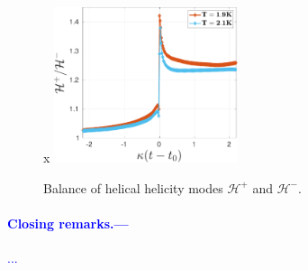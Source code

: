 \documentclass[%
 reprint,
 amsmath,amssymb,
 aps,
 prl,
]{revtex4-2}
\def\blue#1{\textcolor{blue}{#1}}
\begin{document}
\begin{figure}x
    \centering
    \includegraphics*[width=0.48\textwidth]{hel-decomp.pdf}
    \caption{Balance of helical helicity modes $\mathcal{H}^+$ and $\mathcal{H}^-$. }
    \label{fig:helicity-modes}
\end{figure}
\blue{
\paragraph*{Closing remarks.---}...
}

\end{document}

